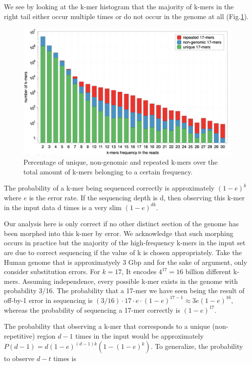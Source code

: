 \documentclass[11pt]{article}
\begin{document}
We see by looking at the k-mer histogram that the majority of k-mers in the right tail either occur multiple times or do not occur in the genome at all (Fig.\ref{fig:hist}).
\begin{figure}
    \centering
    \includegraphics[scale=0.65]{image/histogram.png}
    \caption{Percentage of unique, non-genomic and repeated k-mers over the total amount of k-mers belonging to a certain frequency.}
    \label{fig:hist}
\end{figure}
The probability of a k-mer being sequenced correctly is approximately $(1-e)^k$ where $e$ is the error rate. If the sequencing depth is d, then observing this k-mer in the input data d times  is a very slim 
$(1-e)^{dk}$. 

Our analysis here is only correct if no other distinct section of the genome has been morphed into this k-mer by error. 
We acknowledge that such morphing occurs in practice but the majority of the high-frequency k-mers in the input set are due to correct sequencing if the value of k is chosen appropriately. Take the Human genome that is approximatyely $3$ Gbp and for the sake of argument, only consider substitution errors. For $k=17$, It encodes $4^{17}=16$ billion different k-mers. Assuming independence, every possible k-mer exists in the genome with probability 3/16. The probability that a 17-mer we have seen being the result of off-by-1 error in sequencing is $(3/16) \cdot 17 \cdot e \cdot (1-e)^{17-1} \approx 3 e (1-e)^{16}$, whereas the probability of sequencing a 17-mer correctly is $(1-e)^{17}$.

The probability that observing a k-mer that corresponds to a unique (non-repetitive) region $d-1$ times in the input would be approximately $P(d-1) = d (1-e)^{(d-1)k} (1-(1-e)^k)$. To generalize, the probability to observe $d-t$ times is
\end{document}
